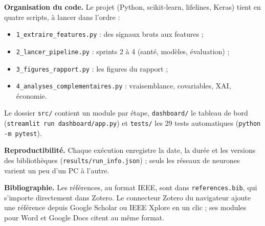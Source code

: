 \textbf{Organisation du code.} Le projet (Python, scikit-learn, lifelines, Keras) tient en quatre scripts, à lancer dans l'ordre :
\begin{itemize}[nosep,leftmargin=1.6em]
  \item \texttt{1\_extraire\_features.py} : des signaux bruts aux features ;
  \item \texttt{2\_lancer\_pipeline.py} : sprints 2 à 4 (santé, modèles, évaluation) ;
  \item \texttt{3\_figures\_rapport.py} : les figures du rapport ;
  \item \texttt{4\_analyses\_complementaires.py} : vraisemblance, covariables, XAI, économie.
\end{itemize}
Le dossier \texttt{src/} contient un module par étape, \texttt{dashboard/} le tableau de bord (\texttt{streamlit run dashboard/app.py}) et \texttt{tests/} les 29 tests automatiques (\texttt{python -m pytest}).

\textbf{Reproductibilité.} Chaque exécution enregistre la date, la durée et les versions des bibliothèques (\texttt{results/run\_info.json}) ; seuls les réseaux de neurones varient un peu d'un PC à l'autre.

\textbf{Bibliographie.} Les références, au format IEEE, sont dans \texttt{references.bib}, qui s'importe directement dans Zotero. Le connecteur Zotero du navigateur ajoute une référence depuis Google Scholar ou IEEE Xplore en un clic ; ses modules pour Word et Google Docs citent au même format.
